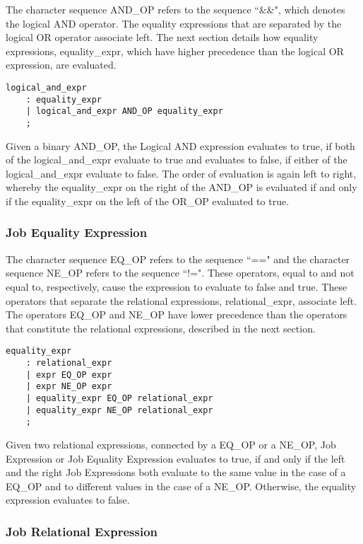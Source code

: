 \documentclass[prodmode,acmtecs]{acmsmall}
\begin{document}
The character sequence AND\_OP refers to the sequence ``\&\&", which 
denotes the logical AND operator. The equality expressions that are 
separated by the logical OR operator associate left. The next section 
details how equality expressions, equality\_expr, which have higher 
precedence than the logical OR expression, are evaluated. 

\begin{lstlisting}
logical_and_expr
	: equality_expr
	| logical_and_expr AND_OP equality_expr
	;
\end{lstlisting}

Given a binary AND\_OP, the Logical AND expression evaluates to true,
if both of the logical\_and\_expr evaluate to true and evaluates to false,
if either of the logical\_and\_expr evaluate to false. 
The order of evaluation is again left to right, whereby the 
equality\_expr on the right of the AND\_OP is evaluated if and only 
if the equality\_expr on the left of the OR\_OP evaluated to true.
\medskip

\subsubsection{Job Equality Expression}

The character sequence EQ\_OP refers to the sequence ``==" and the 
character sequence NE\_OP refers to the sequence ``!=". These operators, 
equal to and not equal to, respectively, cause the expression to 
evaluate to false and true.  These operators that separate the
relational expressions, relational\_expr, associate left. The
operators EQ\_OP and NE\_OP have lower precedence than the 
operators that constitute the relational expressions, described in the 
next section. 

\begin{lstlisting}
equality_expr
	: relational_expr
	| expr EQ_OP expr
	| expr NE_OP expr
	| equality_expr EQ_OP relational_expr
	| equality_expr NE_OP relational_expr
	;
\end{lstlisting}

Given two relational expressions, connected by a EQ\_OP or a NE\_OP, 
Job Expression or Job Equality Expression evaluates to true, 
if and only if the left and the right Job Expressions both evaluate
to the same value in the case of a EQ\_OP and to different values in
the case of a NE\_OP.  Otherwise, the equality expression evaluates
to false.
\medskip

\subsubsection{Job Relational Expression}
\end{document}
